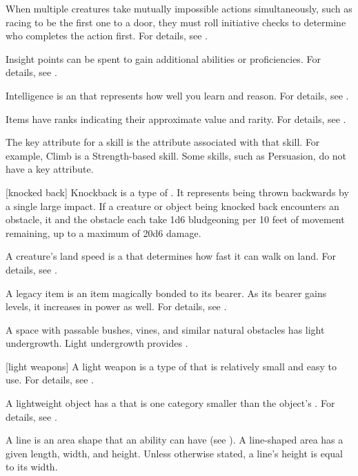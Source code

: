  When multiple creatures take mutually impossible actions simultaneously, such as racing to be the first one to a door, they must roll initiative checks to determine who completes the action first.
For details, see .

 Insight points can be spent to gain additional abilities or proficiencies.
For details, see .

 Intelligence is an  that represents how well you learn and reason.
For details, see .

 Items have ranks indicating their approximate value and rarity.
For details, see .

 The key attribute for a skill is the attribute associated with that skill.
For example, Climb is a Strength-based skill.
Some skills, such as Persuasion, do not have a key attribute.

[knocked back] Knockback is a type of .
It represents being thrown backwards by a single large impact.
If a creature or object being knocked back encounters an obstacle, it and the obstacle each take 1d6 bludgeoning  per 10 feet of movement remaining, up to a maximum of 20d6 damage.

 A creature's land speed is a  that determines how fast it can walk on land.
For details, see .

 A legacy item is an item magically bonded to its bearer.
As its bearer gains levels, it increases in power as well.
For details, see .

 A space with passable bushes, vines, and similar natural obstacles has light undergrowth.
Light undergrowth provides .

[light weapons] A light weapon is a type of  that is relatively small and easy to use.
For details, see .

 A lightweight object has a  that is one category smaller than the object's .
For details, see .

 A line is an area shape that an ability can have (see ).
A line-shaped area has a given length, width, and height.
Unless otherwise stated, a line's height is equal to its width.

